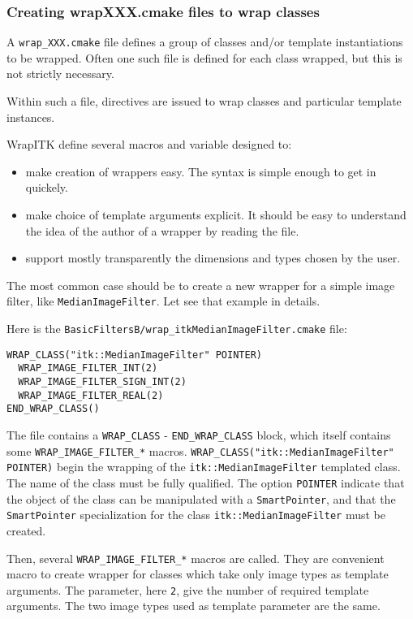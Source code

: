 \documentclass{InsightArticle}
\begin{document}
     \subsubsection{Creating wrapXXX.cmake files to wrap classes}

A \verb$wrap_XXX.cmake$ file defines a group of classes and/or template instantiations
to be wrapped. Often one such file is defined for each class wrapped, but this
is not strictly necessary.

Within such a file, directives are issued to wrap classes and particular
template instances. 

WrapITK define several macros and variable designed to:
\begin{itemize}
  \item make creation of wrappers easy. The syntax is simple enough to get in quickely.
  \item make choice of template arguments explicit. It should be easy to understand
the idea of the author of a wrapper by reading the file.
  \item support mostly transparently the dimensions and types chosen by the user.
\end{itemize}

The most common case should be to create a new wrapper for a simple image filter, like 
\verb$MedianImageFilter$. Let see that example in details.

Here is the \verb$BasicFiltersB/wrap_itkMedianImageFilter.cmake$ file:

\small \begin{verbatim}
WRAP_CLASS("itk::MedianImageFilter" POINTER)
  WRAP_IMAGE_FILTER_INT(2)
  WRAP_IMAGE_FILTER_SIGN_INT(2)
  WRAP_IMAGE_FILTER_REAL(2)
END_WRAP_CLASS()
\end{verbatim} \normalsize

The file contains a \verb$WRAP_CLASS$ - \verb$END_WRAP_CLASS$ block, which itself contains
some \verb$WRAP_IMAGE_FILTER_*$ macros. \verb$WRAP_CLASS("itk::MedianImageFilter" POINTER)$
begin the wrapping of the \verb$itk::MedianImageFilter$ templated class. The name of the class
must be fully qualified. The option \verb$POINTER$ indicate that the object of the class can be
manipulated with a \verb$SmartPointer$, and that the \verb$SmartPointer$ specialization for
the class \verb$itk::MedianImageFilter$ must be created.

Then, several \verb$WRAP_IMAGE_FILTER_*$ macros are called. They are convenient macro to
create wrapper for classes which take only image types as template arguments. The parameter,
here \verb$2$, give the number of required template arguments. The two image types used as
template parameter are the same.
\end{document}
